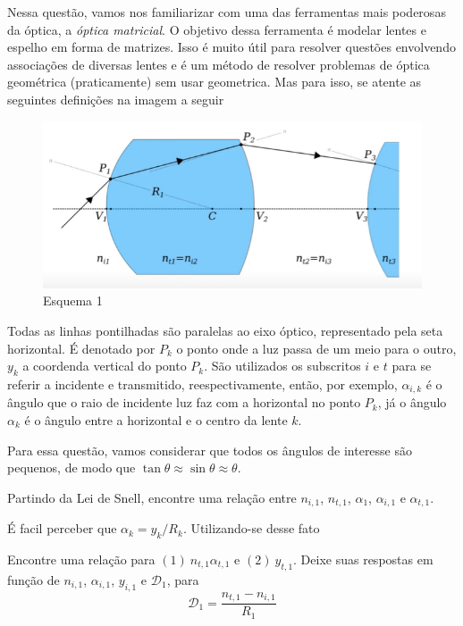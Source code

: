 \documentclass[11pt]{article}
\begin{document}
    \begin{pproblem}
        Nessa questão, vamos nos familiarizar com uma das ferramentas mais poderosas da óptica, a \textit{óptica matricial}. O objetivo dessa ferramenta é modelar lentes e espelho em forma de matrizes. Isso é muito útil para resolver questões envolvendo associações de diversas lentes e é um método de resolver problemas de óptica geométrica (praticamente) sem usar geometrica. Mas para isso, se atente as seguintes definições na imagem a seguir

        \begin{figure}[H]
            \centering
            \includegraphics[width=0.9\linewidth]{imagens/lentes1.png}
            \caption{Esquema 1}
        \end{figure}

        Todas as linhas pontilhadas são paralelas ao eixo óptico, representado pela seta horizontal. É denotado por \(P_k\) o ponto onde a luz passa de um meio para o outro, \(y_k\) a coordenda vertical do ponto \(P_k\). São utilizados os subscritos \(i\) e \(t\) para se referir a incidente e transmitido, reespectivamente, então, por exemplo, \(\alpha_{i,k}\) é o ângulo que o raio de incidente luz faz com a horizontal no ponto \(P_k\), já o ângulo \(\alpha_k\) é o ângulo entre a horizontal e o centro da lente \(k\).
        

        Para essa questão, vamos considerar que todos os ângulos de interesse são pequenos, de modo que \(\tan\theta \approx \sin\theta \approx \theta\).
        \begin{alternativas}
            \item Partindo da Lei de Snell, encontre uma relação entre \(n_{i,1}\), \(n_{t,1}\), \(\alpha_1\), \(\alpha_{i,1}\) e \(\alpha_{t,1}\).
        
        É facil perceber que \(\alpha_k = y_k/R_k\). Utilizando-se desse fato

            \item Encontre uma relação para \((1) \ n_{t,1}\alpha_{t,1}\) e \((2) \ y_{t,1}\). Deixe suas respostas em função de \(n_{i,1}\), \(\alpha_{i,1}\), \(y_{i,1}\) e \(\mathcal{D}_1\), para
            \[\mathcal{D}_1 = \frac{n_{t,1}-n_{i,1}}{R_1}\]


\end{alternativas}
\end{pproblem}
\end{document}
